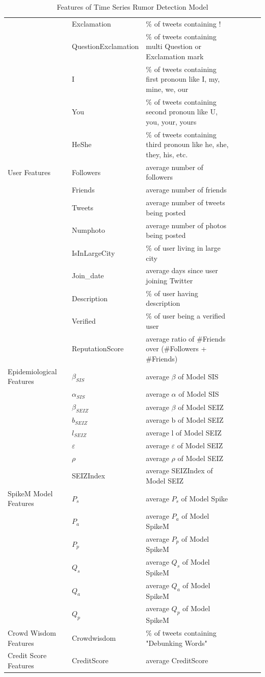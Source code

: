 \begin{table}[!h]
{\begin{tabular}{@{}lllllll@{}}
   & Exclamation & \% of tweets containing ! \\
   & QuestionExclamation & \% of tweets containing multi Question or Exclamation mark \\ 
   & I & \% of tweets containing first pronoun like I, my, mine, we, our   \\
   & You & \% of tweets containing second pronoun like U, you, your, yours \\ 
   & HeShe & \% of tweets containing third pronoun like he, she, they, his, etc. \\ \midrule
   User Features & Followers  & average number of followers\\
 	& Friends  & average number of friends\\
 	& Tweets  & average number of tweets being posted\\
 	& Numphoto  & average number of photos being posted\\
 	& IsInLargeCity  & \% of user living in large city\\
 	& Join\_date & average days since user joining Twitter\\
 	& Description  & \% of user having description\\
 	& Verified  & \% of user being a verified user\\
 	& ReputationScore & average ratio of \#Friends over (\#Followers + \#Friends)\\   \midrule
 Epidemiological Features & $\beta_{SIS}$ & average $\beta$ of Model SIS\\
 							& $\alpha_{SIS} $ & average $\alpha$ of Model SIS\\
 							& $\beta_{SEIZ}$ & average $\beta$ of Model SEIZ\\
 							& $b_{SEIZ}$ & average b of Model SEIZ\\
 							& $l_{SEIZ}$ & average l of Model SEIZ\\
 							& $\varepsilon$ & average $\varepsilon$ of Model SEIZ\\
 							& $\rho$ & average $\rho$ of Model SEIZ\\
 							& SEIZIndex & average SEIZIndex of Model SEIZ\\
		\midrule	
 SpikeM Model Features & $P_s$ & average $P_s$ of Model Spike\\
 							& $P_a$ & average $P_a$ of Model SpikeM\\
 							& $P_p$ & average $P_p$ of Model SpikeM\\
 							& $Q_s$  & average $Q_s$ of Model SpikeM\\
 							& $Q_a$ & average $Q_a$ of Model SpikeM\\
 							& $Q_p$ & average $Q_p$ of Model SpikeM\\ \midrule	
 Crowd Wisdom Features & Crowdwisdom & \% of tweets containing "Debunking Words"\\ \midrule
	
 Credit Score Features & CreditScore & average CreditScore\\
 \bottomrule
 \end{tabular}}
 \caption{Features of Time Series Rumor Detection Model}
 \label{tab:full_features}
\end{table}
